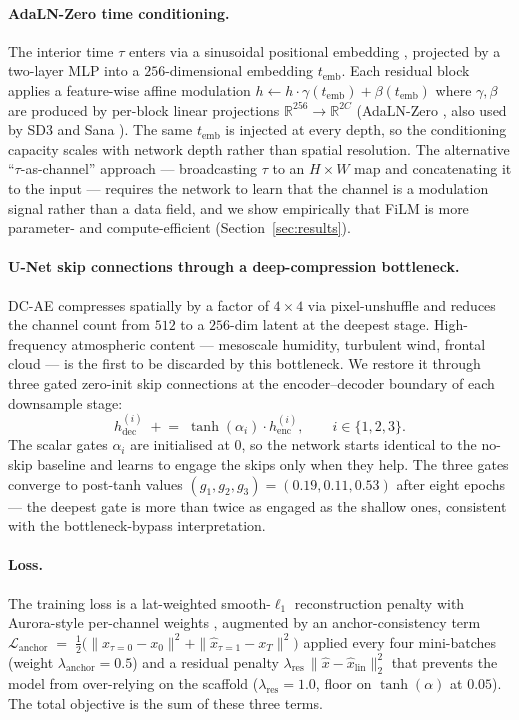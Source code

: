 \documentclass[10pt,letterpaper,twocolumn]{article}
\begin{document}
\paragraph{AdaLN-Zero time conditioning.}
The interior time $\tau$ enters via a sinusoidal positional embedding
\cite{peebles2023dit}, projected by a two-layer MLP into a
$256$-dimensional embedding $t_\text{emb}$. Each residual block applies a
feature-wise affine modulation
$h \leftarrow h\cdot\gamma(t_\text{emb}) + \beta(t_\text{emb})$ where
$\gamma,\beta$ are produced by per-block linear projections
$\mathbb{R}^{256}\to\mathbb{R}^{2C}$ (AdaLN-Zero \cite{peebles2023dit}, also
used by SD3 \cite{esser2024sd3} and Sana \cite{xie2024dcae}). The same
$t_\text{emb}$ is injected at every depth, so the conditioning capacity
scales with network depth rather than spatial resolution. The
alternative ``$\tau$-as-channel'' approach --- broadcasting $\tau$ to an
$H{\times}W$ map and concatenating it to the input --- requires the
network to learn that the channel is a modulation signal rather than a
data field, and we show empirically that FiLM is more parameter-
and compute-efficient (Section~\ref{sec:results}).

\paragraph{U-Net skip connections through a deep-compression bottleneck.}
DC-AE compresses spatially by a factor of $4{\times}4$ via pixel-unshuffle
and reduces the channel count from $512$ to a $256$-dim latent at the
deepest stage. High-frequency atmospheric content --- mesoscale humidity,
turbulent wind, frontal cloud --- is the first to be discarded by this
bottleneck. We restore it through three gated zero-init skip connections
at the encoder--decoder boundary of each downsample stage:
\begin{equation}
h_\text{dec}^{(i)} \;\mathrel{+}{=}\; \tanh(\alpha_i)\cdot h_\text{enc}^{(i)},\qquad i\in\{1,2,3\}.
\label{eq:skip}
\end{equation}
The scalar gates $\alpha_i$ are initialised at $0$, so the network starts
identical to the no-skip baseline and learns to engage the skips only
when they help. The three gates converge to post-tanh values
$(g_1,g_2,g_3){=}(0.19,0.11,0.53)$ after eight epochs --- the deepest
gate is more than twice as engaged as the shallow ones, consistent with
the bottleneck-bypass interpretation.

\paragraph{Loss.}
The training loss is a lat-weighted smooth-$\ell_1$ reconstruction
penalty with Aurora-style per-channel weights
\cite{bodnar2024aurora}, augmented by an anchor-consistency term
$\mathcal{L}_\text{anchor}\;{=}\;\tfrac{1}{2}\bigl(\|\hat
x_{\tau=0}{-}x_0\|^2 + \|\hat x_{\tau=1}{-}x_T\|^2\bigr)$ applied every
four mini-batches (weight $\lambda_\text{anchor}{=}0.5$) and a residual
penalty $\lambda_\text{res}\,\|\hat x{-}\hat x_\text{lin}\|_2^2$ that
prevents the model from over-relying on the scaffold
($\lambda_\text{res}{=}1.0$, floor on $\tanh(\alpha)$ at $0.05$). The
total objective is the sum of these three terms.
\end{document}
